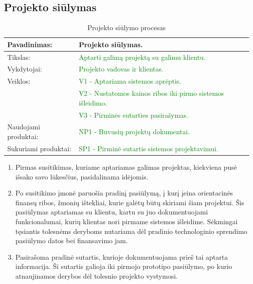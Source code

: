 \documentclass{VUMIFPSkursinis}
\begin{document}
	\newpage

	\subsection{Projekto siūlymas}
	\begin{center}
		\begin{table}[ht]
			\caption{Projekto siūlymo procesas}
			\begin{tabular}{ | l | l | }
				\hline
				Pavadinimas:          & Projekto siūlymas.						\\ \hline
				Tikslas:              & \textcolor{green}{Aptarti galimą projektą su galimu klientu.}			\\ \hline
				Vykdytojai:           & \textcolor{green}{Projekto vadovas ir klientas.}					\\ \hline
				Veiklos:              & \textcolor{green}{V1 - Aptariama sistemos aprėptis. }				\\
				                      & \textcolor{green}{V2 - Nustatomos kainos ribos iki pirmo sistemos išleidimo.}	\\
				                      & \textcolor{green}{V3 - Pirminės sutarties pasirašymas.}				\\ \hline
				Naudojami produktai:	& \textcolor{green}{NP1 - Buvusių projektų dokumentai. }				\\ \hline
				Sukuriami produktai:	& \textcolor{green}{SP1 - Pirminė sutartis sistemos projektavimui.	}	\\ \hline
			\end{tabular}
		\end{table}
	\end{center}

	\begin{enumerate}
		\item{
			Pirmas susitikimas, kuriame aptariamas galimas projektas, kiekviena pusė išsako savo lūkesčius, pasidalinama idėjomis.
		}
		\item{
			Po susitikimo įmonė paruošia pradinį pasiūlymą, į kurį įeina orientacinės finansų ribos, žmonių ištekliai, kurie galėtų būtų skiriami šiam projektui.
			Šis pasiūlymas aptariamas su klientu, kartu su juo dokumentuojami funkcionalumai, kurių klientas nori pirmame sistemos išleidime.
			Sėkmingai tęsiantis tolesnėms deryboms nutariama dėl pradinio technologinio sprendimo pasiūlymo datos bei finansavimo jam.
		}
		\item{
			Pasirašoma pradinė sutartis, kurioje dokumentuojama prieš tai aptarta informacija.
			Ši sutartis galioja iki pirmojo prototipo pasiūlymo, po kurio atnaujinamos derybos dėl tolesnio projekto vystymosi.
		}
	\end{enumerate}
\end{document}

